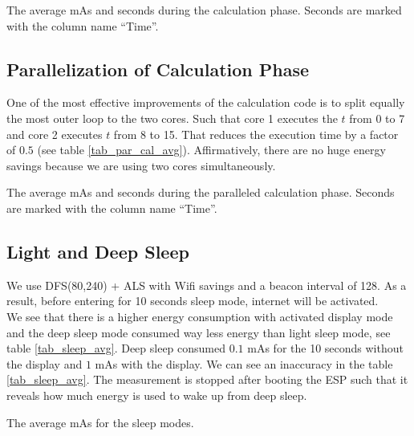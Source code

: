 \begin{table}[h]
    \centering
    \resizebox{\columnwidth}{!}{%
        
    }
    \caption{The average mAs and seconds during the calculation phase. Seconds are marked with the column name ``Time''.}
    \label{tab_cal_avg}
\end{table}



\subsection{Parallelization of Calculation Phase}
One of the most effective improvements of the calculation code is to split equally the
most outer loop to the two cores. Such that core 1 executes the $t$ from 0 to 7 and core 2
executes $t$ from 8 to 15. That reduces the execution time by a factor of $0.5$
(see table \ref{tab_par_cal_avg}). Affirmatively, there are no huge energy savings because
we are using two cores simultaneously.

\begin{table}[h]
    \centering
    \resizebox{\columnwidth}{!}{%
        
    }
    \caption{The average mAs and seconds during the paralleled calculation phase. Seconds are marked with the column name ``Time''.}
    \label{tab_par_cal_avg}
\end{table}


\subsection{Light and Deep Sleep}
We use DFS(80,240) + ALS with Wifi savings and a beacon interval of 128. As a result, before entering
for 10 seconds sleep mode, internet will be activated. \\
We see that there is a higher energy consumption with activated display mode and the deep sleep mode
consumed way less energy than light sleep mode, see table \ref{tab_sleep_avg}.
Deep sleep consumed $0.1$ mAs for the 10 seconds without the display and $1$ mAs
with the display.
We can see an inaccuracy in the table \ref{tab_sleep_avg}. The measurement is stopped
after booting the ESP such that it reveals how much energy is used to wake up from deep sleep.


\begin{table}[h]
    \centering
    \resizebox{\columnwidth}{!}{%
        
    }
    \caption{The average mAs for the sleep modes.}
    \label{tab_sleep_avg}
\end{table}



